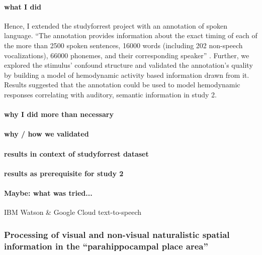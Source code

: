 \paragraph{what I did}

Hence, I extended the studyforrest project with an annotation of spoken
language.
``The annotation provides information about the exact timing of each of the more
than 2500 spoken sentences, 16000 words (including 202 non-speech
vocalizations), 66000 phonemes, and their corresponding speaker''
\citep{haeusler2021speechanno}.
%
Further, we explored the stimulus' confound structure and validated the
annotation's quality by building a model of hemodynamic activity based
information drawn from it.
%
Results suggested that the annotation could be used to model hemodynamic
responses correlating with auditory, semantic information in study 2.


\paragraph{why I did more than necessary}


\paragraph{why / how we validated}


\paragraph{results in context of studyforrest dataset}


\paragraph{results as prerequisite for study 2}


\paragraph{Maybe: what was tried...}

IBM Watson \& Google Cloud text-to-speech


\subsubsection{Processing of visual and non-visual naturalistic spatial
information in the ``parahippocampal place area''}

%

